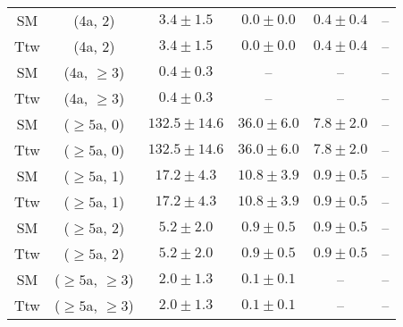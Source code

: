 \begin{table}[h!]
{\begin{tabular}{cccccc}
	SM & (4a, 2) & $3.4\pm 1.5$ & $0.0\pm 0.0$ & $0.4\pm 0.4$ & -- \\[0.5ex] 
	Ttw & (4a, 2) & $3.4\pm 1.5$ & $0.0\pm 0.0$ & $0.4\pm 0.4$ & -- \\[0.5ex] 
	SM & (4a, $\ge3$) & $0.4\pm 0.3$ & -- & -- & -- \\[0.5ex] 
	Ttw & (4a, $\ge3$) & $0.4\pm 0.3$ & -- & -- & -- \\[0.5ex] 
	SM & ($\ge5$a, 0) & $132.5\pm 14.6$ & $36.0\pm 6.0$ & $7.8\pm 2.0$ & -- \\[0.5ex] 
	Ttw & ($\ge5$a, 0) & $132.5\pm 14.6$ & $36.0\pm 6.0$ & $7.8\pm 2.0$ & -- \\[0.5ex] 
	SM & ($\ge5$a, 1) & $17.2\pm 4.3$ & $10.8\pm 3.9$ & $0.9\pm 0.5$ & -- \\[0.5ex] 
	Ttw & ($\ge5$a, 1) & $17.2\pm 4.3$ & $10.8\pm 3.9$ & $0.9\pm 0.5$ & -- \\[0.5ex] 
	SM & ($\ge5$a, 2) & $5.2\pm 2.0$ & $0.9\pm 0.5$ & $0.9\pm 0.5$ & -- \\[0.5ex] 
	Ttw & ($\ge5$a, 2) & $5.2\pm 2.0$ & $0.9\pm 0.5$ & $0.9\pm 0.5$ & -- \\[0.5ex] 
	SM & ($\ge5$a, $\ge3$) & $2.0\pm 1.3$ & $0.1\pm 0.1$ & -- & -- \\[0.5ex] 
	Ttw & ($\ge5$a, $\ge3$) & $2.0\pm 1.3$ & $0.1\pm 0.1$ & -- & -- \\[0.5ex] 
	\hline
	\hline
\end{tabular}}
\end{table}
